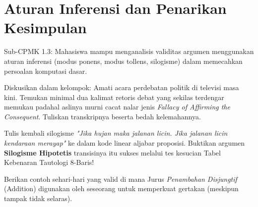 \documentclass[../main]{subfiles}
\begin{document}
\chapter{Aturan Inferensi dan Penarikan Kesimpulan}

\begin{subcpmk}
  \item Sub-CPMK 1.3: Mahasiswa mampu menganalisis validitas argumen menggunakan aturan inferensi (modus ponens, modus tollens, silogisme) dalam memecahkan persoalan komputasi dasar.
\end{subcpmk}










\begin{aktivitas}
  \item Diskusikan dalam kelompok: Amati acara perdebatan politik di televisi masa kini. Temukan minimal dua kalimat retoris debat yang sekilas terdengar memukau padahal aslinya murni cacat nalar jenis \textit{Fallacy of Affirming the Consequent}. Tuliskan transkripnya beserta bedah kelemahannya.
  \item Tulis kembali silogisme \textit{"Jika hujan maka jalanan licin. Jika jalanan licin kendaraan merayap"} ke dalam kode linear aljabar proposisi. Buktikan argumen \textbf{Silogisme Hipotetis} transisinya itu sukses melalui tes kesucian Tabel Kebenaran Tautologi 8-Baris!
  \item Berikan contoh sehari-hari yang valid di mana Jurus \textit{Penambahan Disjungtif} (Addition) digunakan oleh seseorang untuk memperkuat gertakan (meskipun tampak tidak selaras).
\end{aktivitas}

\end{document}
